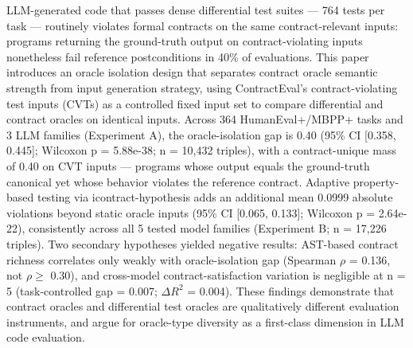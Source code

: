 
LLM-generated code that passes dense differential test suites --- 764 tests per task --- routinely violates formal contracts on the same contract-relevant inputs: programs returning the ground-truth output on contract-violating inputs nonetheless fail reference postconditions in 40\% of evaluations. This paper introduces an oracle isolation design that separates contract oracle semantic strength from input generation strategy, using ContractEval's contract-violating test inputs (CVTs) as a controlled fixed input set to compare differential and contract oracles on identical inputs. Across 364 HumanEval+/MBPP+ tasks and 3 LLM families (Experiment A), the oracle-isolation gap is 0.40 (95\% CI [0.358, 0.445]; Wilcoxon p = 5.88e-38; n = 10,432 triples), with a contract-unique mass of 0.40 on CVT inputs --- programs whose output equals the ground-truth canonical yet whose behavior violates the reference contract. Adaptive property-based testing via icontract-hypothesis adds an additional mean 0.0999 absolute violations beyond static oracle inputs (95\% CI [0.065, 0.133]; Wilcoxon p = 2.64e-22), consistently across all 5 tested model families (Experiment B; n = 17,226 triples). Two secondary hypotheses yielded negative results: AST-based contract richness correlates only weakly with oracle-isolation gap (Spearman $\rho$ = 0.136, not $\rho \geq$ 0.30), and cross-model contract-satisfaction variation is negligible at n = 5 (task-controlled gap = 0.007; $\Delta R^2$ = 0.004). These findings demonstrate that contract oracles and differential test oracles are qualitatively different evaluation instruments, and argue for oracle-type diversity as a first-class dimension in LLM code evaluation.

